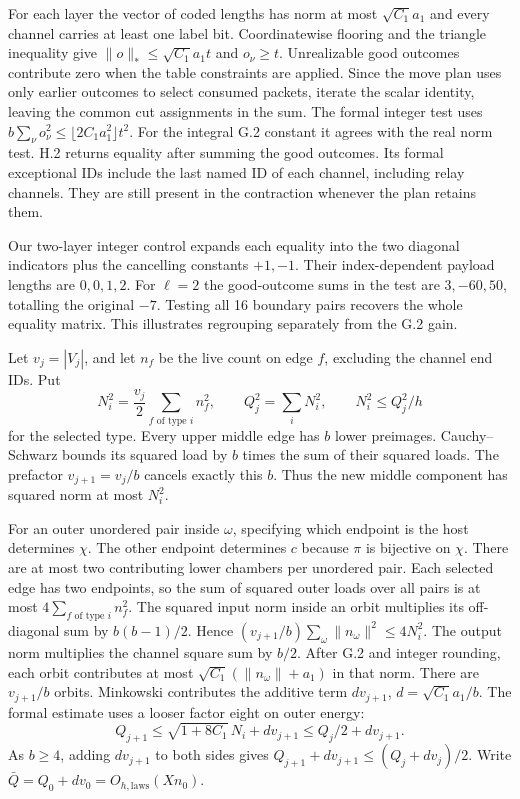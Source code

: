 For each layer the vector of coded lengths has norm at most $\sqrt{C_1}a_1$ and every channel carries at least one label bit. Coordinatewise flooring and the triangle inequality give $\|o\|_*\le\sqrt{C_1}a_1t$ and $o_\nu\ge t$. Unrealizable good outcomes contribute zero when the table constraints are applied. Since the move plan uses only earlier outcomes to select consumed packets, iterate the scalar identity, leaving the common cut assignments in the sum. The formal integer test uses $b\sum_\nu o_\nu^2\le\lfloor2C_1 a_1^2\rfloor t^2$. For the integral G.2 constant it agrees with the real norm test. H.2 returns equality after summing the good outcomes. Its formal exceptional IDs include the last named ID of each channel, including relay channels. They are still present in the contraction whenever the plan retains them.

Our two-layer integer control expands each equality into the two diagonal indicators plus the cancelling constants $+1,-1$. Their index-dependent payload lengths are $0,0,1,2$. For $\ell=2$ the good-outcome sums in the test are $3,-60,50$, totalling the original $-7$. Testing all 16 boundary pairs recovers the whole equality matrix. This illustrates regrouping separately from the G.2 gain.


\newpage
{}
Let $v_j=|V_j|$, and let $n_f$ be the live count on edge $f$, excluding the channel end IDs. Put
\[
 N_i^2=\frac{v_j}{2}\sum_{f\text{ of type }i} n_f^2,\qquad
 Q_j^2=\sum_i N_i^2,\qquad N_i^2\le Q_j^2/h
\]
for the selected type. Every upper middle edge has $b$ lower preimages. Cauchy--Schwarz bounds its squared load by $b$ times the sum of their squared loads. The prefactor $v_{j+1}=v_j/b$ cancels exactly this $b$. Thus the new middle component has squared norm at most $N_i^2$.

For an outer unordered pair inside $\omega$, specifying which endpoint is the host determines $\chi$. The other endpoint determines $c$ because $\pi$ is bijective on $\chi$. There are at most two contributing lower chambers per unordered pair. Each selected edge has two endpoints, so the sum of squared outer loads over all pairs is at most $4\sum_{f\text{ of type }i}n_f^2$. The squared input norm inside an orbit multiplies its off-diagonal sum by $b(b-1)/2$. Hence $(v_{j+1}/b)\sum_\omega\|n_\omega\|^2\le4N_i^2$. The output norm multiplies the channel square sum by $b/2$. After G.2 and integer rounding, each orbit contributes at most $\sqrt{C_1}(\|n_\omega\|+a_1)$ in that norm. There are $v_{j+1}/b$ orbits. Minkowski contributes the additive term $dv_{j+1}$, $d=\sqrt{C_1}a_1/b$. The formal estimate uses a looser factor eight on outer energy:
\[
 Q_{j+1}\le\sqrt{1+8C_1}\,N_i+dv_{j+1}
          \le Q_j/2+dv_{j+1}.
\]
As $b\ge4$, adding $dv_{j+1}$ to both sides gives $Q_{j+1}+dv_{j+1}\le(Q_j+dv_j)/2$. Write $\bar Q=Q_0+dv_0=O_{h,\mathrm{laws}}(Xn_0)$.

